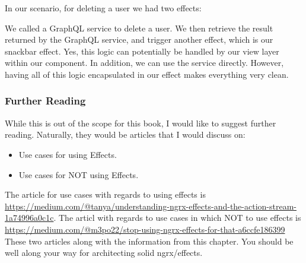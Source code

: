 In our scenario, for deleting a user we had two effects:

We called a GraphQL service to delete a user. We then retrieve the result
returned by the GraphQL service, and trigger another effect, which is our
snackbar effect. Yes, this logic can potentially be handled by our view layer
within our component. In addition, we can use the service directly. However,
having all of this logic encapsulated in our effect makes everything very
clean.

\subsubsection{ Further Reading }
While this is out of the scope for this book, I would like to suggest further
reading. Naturally, they would be articles that I would discuss on:
\begin{itemize}
  \item Use cases for using Effects.
  \item Use cases for NOT using Effects.
\end{itemize}

The article for use cases with regards to using effects is \href{"Understanding NgRx
Effects and the Action Stream"}{https://medium.com/@tanya/understanding-ngrx-effects-and-the-action-stream-1a74996a0c1c}.
The articl with regards to use cases in which NOT to use effects is
\href{Stop using ngrx/effects for that}{https://medium.com/@m3po22/stop-using-ngrx-effects-for-that-a6ccfe186399}
These two articles along with the information from this chapter. You should be
well along your way for architecting solid ngrx/effects.
